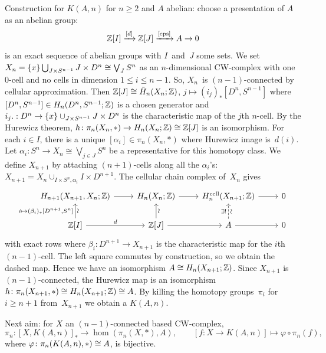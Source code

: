 \documentclass[language=english]{TemplateLecture}
\begin{document}
Construction for \(K(A,n)\) for \(n \ge 2\) and \(A\) abelian: choose a presentation of \(A\) as an abelian group:
\begin{equation*}
    \mathbb{Z}[I] \xrightarrow{[d]} \mathbb{Z}[J] \xrightarrow{[\mathrm{eps}]} A \to 0
\end{equation*}
is an exact sequence of abelian groups with \(I\)~and~\(J\) some sets.
We set \(X_n = \{x\} \bigcup_{J \times S^{n-1}} J \times D^n \cong \bigvee_J S^n\) as an \(n\)-dimensional CW-complex with one \(0\)-cell and no cells in dimension \(1 \le i \le n-1\).
So, \(X_n\)~is \((n-1)\)-connected by cellular approximation.
Then \(\mathbb{Z}[J] \cong \tilde{H}_n(X_n; \mathbb{Z})\), \(j \mapsto (i_j)_* [D^n, S^{n-1}]\) where \([D^n, S^{n-1}] \in H_n(D^n, S^{n-1}; \mathbb{Z})\) is a chosen generator and \(i_j .: D^n \to \{x\} \cup_{J \times S^{n-1}} J \times D^n\) is the characteristic map of the \(j\)th \(n\)-cell.
By the Hurewicz theorem, \(h \colon \pi_n(X_n, *) \to H_n(X_n; \mathbb{Z}) \cong \mathbb{Z}[J]\) is an isomorphism.
For each \(i \in I\), there is a unique \([\alpha_i] \in \pi_n(X_n, *)\) where Hurewicz image is~\(d(i)\).
Let \(\alpha_i \colon S^n \to X_n \cong \bigvee_{j \in J} S^n\) be a representative for this homotopy class.
We define \(X_{n+1}\) by attaching \((n+1)\)-cells along all the \(\alpha_i\)'s: \(X_{n+1} = X_n \cup_{I \times S^n, \alpha_i} I \times D^{n+1}\).
The cellular chain complex of~\(X_n\) gives
\begin{equation*}
    \begin{tikzcd}
        H_{n+1}(X_{n+1}, X_n; \iz) \ar[r]
        & H_n(X_n; \iz) \ar[r]
        & H_n^{\mathrm{cell}}(X_{n+1}; \iz) \ar[r]
        & 0 \\
        \iz[I] \ar[u, "\sim"' sloped, "{i \mapsto (\beta_i)_* [D^{n+1}, S^n]}"] \ar[r, "d"]
        & \iz[J] \ar[r] \ar[u, "\sim"' sloped]
        & A \ar[r] \ar[u, dashed, "\sim"' sloped, "\exists!"]
        & 0
    \end{tikzcd}
\end{equation*}
with exact rows where \(\beta_i \colon D^{n+1} \to X_{n+1}\) is the characteristic map for the \(i\)th \((n-1)\)-cell.
The left square commutes by construction, so we obtain the dashed map.
Hence we have an isomorphism \(A \cong H_n(X_{n+1}; \mathbb{Z})\).
Since \(X_{n+1}\) is \((n-1)\)-connected, the Hurewicz map is an isomorphism \(h \colon \pi_n(X_{n+1}, *) \cong H_n(X_{n+1}; \mathbb{Z}) \cong A\).
By killing the homotopy groups~\(\pi_i\) for \(i \ge n+1\) from~\(X_{n+1}\) we obtain a \(K(A,n)\).

Next aim: for \(X\) an \((n-1)\)-connected based CW-complex,
\begin{equation*}
    \pi_n \colon [X, K(A,n)]_* \to \hom(\pi_n(X,*), A), \qquad
    [f \colon X \to K(A,n)] \mapsto \varphi \circ \pi_n(f),
\end{equation*}
where \(\varphi \colon \pi_n(K(A,n), *) \cong A\), is bijective.
\end{document}
